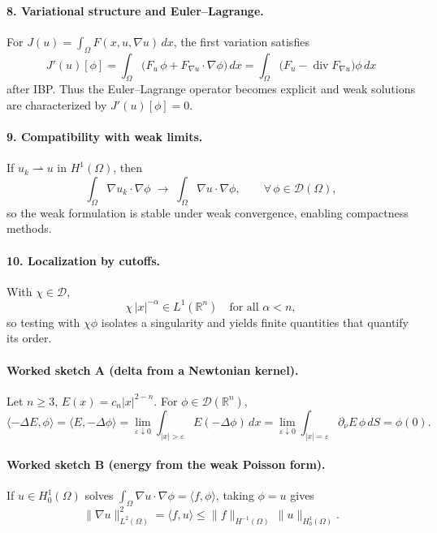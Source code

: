 \documentclass[12pt,a4paper]{article}
\theoremstyle{plain}
\theoremstyle{definition}
\theoremstyle{remark}
\theoremstyle{remark}
\begin{document}
\smallskip

\paragraph{8. Variational structure and Euler--Lagrange.}
For $J(u)=\int_\Omega F(x,u,\nabla u)\,dx$,
the first variation satisfies
\[
J'(u)[\phi]
= \int_\Omega \big(F_u\,\phi + F_{\nabla u}\cdot\nabla\phi\big)\,dx
= \int_\Omega \Big( F_u - \operatorname{div}F_{\nabla u} \Big)\phi\,dx
\]
after IBP. Thus the Euler--Lagrange operator becomes explicit and weak solutions are characterized by $J'(u)[\phi]=0$.

\smallskip

\paragraph{9. Compatibility with weak limits.}
If $u_k\rightharpoonup u$ in $H^1(\Omega)$, then
\[
\int_\Omega \nabla u_k\cdot\nabla\phi \;\longrightarrow\; \int_\Omega \nabla u\cdot\nabla\phi,
\qquad \forall\,\phi\in\mathcal D(\Omega),
\]
so the weak formulation is stable under weak convergence, enabling compactness methods.

\smallskip

\paragraph{10. Localization by cutoffs.}
With $\chi\in\mathcal D$,
\[
\chi\,|x|^{-\alpha}\in L^1(\mathbb R^n)\quad\text{for all }\alpha<n,
\]
so testing with $\chi\phi$ isolates a singularity and yields finite quantities that quantify its order.

\bigskip
\bigskip

\paragraph{Worked sketch A (delta from a Newtonian kernel).}
Let $n\ge3$, $E(x)=c_n|x|^{2-n}$. For $\phi\in\mathcal D(\mathbb R^n)$,
\[
\langle -\Delta E,\phi\rangle
= \langle E,-\Delta\phi\rangle
= \lim_{\varepsilon\downarrow0}\int_{|x|>\varepsilon} E(-\Delta\phi)\,dx
= \lim_{\varepsilon\downarrow0}\int_{|x|=\varepsilon} \partial_\nu E\,\phi\,dS
= \phi(0).
\]

\smallskip

\paragraph{Worked sketch B (energy from the weak Poisson form).}
If $u\in H_0^1(\Omega)$ solves $\int_\Omega \nabla u\cdot\nabla\phi=\langle f,\phi\rangle$, taking $\phi=u$ gives
\[
\|\nabla u\|_{L^2(\Omega)}^2
= \langle f,u\rangle
\le \|f\|_{H^{-1}(\Omega)}\,\|u\|_{H_0^1(\Omega)}.
\]
\end{document}
